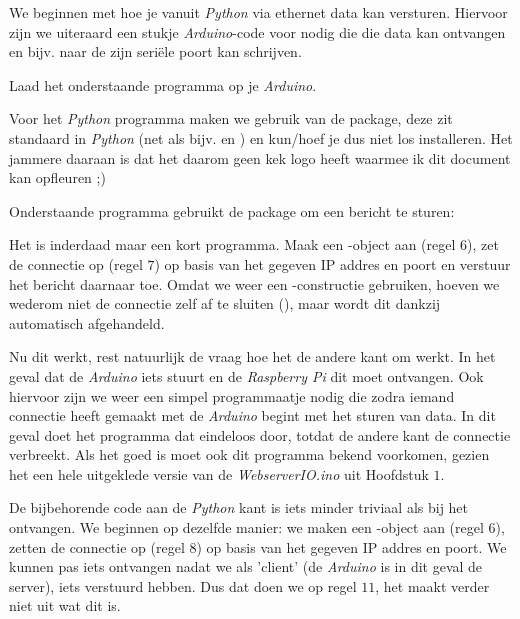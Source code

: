 We beginnen met hoe je vanuit \textit{Python} via ethernet data kan versturen. Hiervoor zijn we uiteraard een stukje \textit{Arduino}-code voor nodig die die data kan ontvangen en bijv. naar de zijn seriële poort kan schrijven.

\begin{exercise}
Laad het onderstaande programma op je \textit{Arduino}. 
\end{exercise}

\newpage



Voor het \textit{Python} programma maken we gebruik van de  package, deze zit standaard in \textit{Python} (net als bijv.  en ) en kun/hoef je dus niet los installeren. Het jammere daaraan is dat het daarom geen kek logo heeft waarmee ik dit document kan opfleuren ;) 

Onderstaande programma gebruikt de  package om een bericht te sturen:

Het is inderdaad maar een kort programma. Maak een -object aan (regel $6$), zet de connectie op (regel $7$) op basis van het gegeven IP addres en poort en verstuur het bericht daarnaar toe. Omdat we weer een -constructie gebruiken, hoeven we wederom niet de connectie zelf af te sluiten (), maar wordt dit dankzij  automatisch afgehandeld.  

\newpage 

Nu dit werkt, rest natuurlijk de vraag hoe het de andere kant om werkt. In het geval dat de \textit{Arduino} iets stuurt en de \textit{Raspberry Pi} dit moet ontvangen. Ook hiervoor zijn we weer een simpel programmaatje nodig die zodra iemand connectie heeft gemaakt met de \textit{Arduino} begint met het sturen van data. In dit geval doet het programma dat eindeloos door, totdat de andere kant de connectie verbreekt. Als het goed is moet ook dit programma bekend voorkomen, gezien het een hele uitgeklede versie van de \textit{WebserverIO.ino} uit Hoofdstuk $1$.



De bijbehorende code aan de \textit{Python} kant is iets minder triviaal als bij het ontvangen. 
We beginnen op dezelfde manier: we maken een -object aan (regel $6$), zetten de connectie op (regel $8$) op basis van het gegeven IP addres en poort. We kunnen pas iets ontvangen nadat we als 'client' (de \textit{Arduino} is in dit geval de server), iets verstuurd hebben. Dus dat doen we op regel $11$, het maakt verder niet uit wat dit is. 

